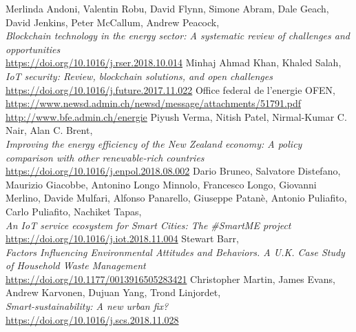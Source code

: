 \documentclass[11pt]{article}
\begin{document}
\begin{thebibliography}{22}
	Merlinda Andoni, Valentin Robu, David Flynn, Simone Abram, Dale Geach,  David Jenkins, Peter McCallum, Andrew Peacock,\\
	\textit{Blockchain technology in the energy sector: A systematic review of challenges and opportunities}\\
	\hyperref[https://doi.org/10.1016/j.rser.2018.10.014]{https://doi.org/10.1016/j.rser.2018.10.014}
	Minhaj Ahmad Khan, Khaled Salah, \\
	\textit{IoT security: Review, blockchain solutions, and open challenges}\\
	\hyperref[https://doi.org/10.1016/j.future.2017.11.022]{https://doi.org/10.1016/j.future.2017.11.022}
	Office federal de l'energie OFEN, \\
	\hyperref[https://www.newsd.admin.ch/newsd/message/attachments/51791.pdf]{https://www.newsd.admin.ch/newsd/message/attachments/51791.pdf}\\
	\hyperref[http://www.bfe.admin.ch/energie]{http://www.bfe.admin.ch/energie}
	Piyush Verma, Nitish Patel, Nirmal-Kumar C. Nair, Alan C. Brent, \\
	\textit{Improving the energy efficiency of the New Zealand economy: A policy comparison with other renewable-rich countries}\\
	\hyperref[https://doi.org/10.1016/j.enpol.2018.08.002]{https://doi.org/10.1016/j.enpol.2018.08.002}
	Dario Bruneo, Salvatore Distefano, Maurizio Giacobbe, Antonino Longo Minnolo, Francesco Longo, Giovanni Merlino, Davide Mulfari, Alfonso Panarello, Giuseppe Patanè, Antonio Puliafito, Carlo Puliafito, Nachiket Tapas, \\
	\textit{An IoT service ecosystem for Smart Cities: The \#SmartME project}\\
	\hyperref[https://doi.org/10.1016/j.iot.2018.11.004]{https://doi.org/10.1016/j.iot.2018.11.004}
	Stewart Barr, \\
	\textit{Factors Influencing Environmental Attitudes and Behaviors. A U.K. Case Study of Household Waste Management}\\
	\hyperref[https://doi.org/10.1177/0013916505283421]{https://doi.org/10.1177/0013916505283421}
	Christopher Martin, James Evans, Andrew Karvonen, Dujuan Yang, Trond Linjordet, \\
	\textit{Smart-sustainability: A new urban fix?}\\
	\hyperref[https://doi.org/10.1016/j.scs.2018.11.028]{https://doi.org/10.1016/j.scs.2018.11.028}

\end{thebibliography}
\end{document}
